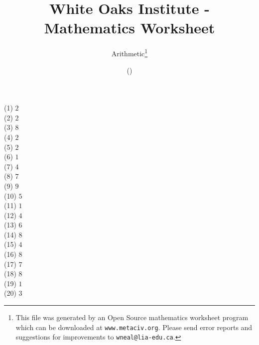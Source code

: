 \documentclass[letter]{article}
\begin{document}
\title{White Oaks Institute - Mathematics Worksheet}
\author{Arithmetic\thanks{This file was generated by an \textsf{Open Source} mathematics worksheet program which can be downloaded at \texttt{www.metaciv.org}. Please send error reports and suggestions for improvements to \texttt{wneal@lia-edu.ca}.}}
\date{\XCfileversion{} (\XCfiledate)}
\maketitle
\begin{multicols}{2}(1) $2$\\(2) $2$\\(3) $8$\\(4) $2$\\(5) $2$\\(6) $1$\\(7) $4$\\(8) $7$\\(9) $9$\\(10) $5$\\(11) $1$\\(12) $4$\\(13) $6$\\(14) $8$\\(15) $4$\\(16) $8$\\(17) $7$\\(18) $8$\\(19) $1$\\(20) $3$\end{multicols}
\end{document}
